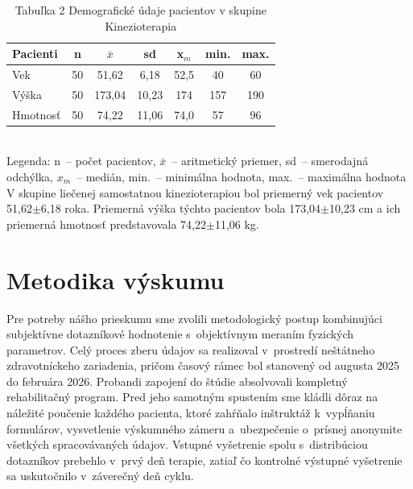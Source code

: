 \begin{table}[H]
\centering
\caption*{Tabuľka 2 Demografické údaje pacientov v skupine Kinezioterapia}
\begin{tabular}{|l|c|c|c|c|c|c|}
\hline
\textbf{Pacienti} & \textbf{n} & \textbf{$\bar{x}$} & \textbf{sd} & \textbf{x$_m$} & \textbf{min.} & \textbf{max.} \\ \hline
Vek & 50 & 51,62 & 6,18 & 52,5 & 40 & 60 \\ \hline
Výška & 50 & 173,04 & 10,23 & 174 & 157 & 190 \\ \hline
Hmotnosť & 50 & 74,22 & 11,06 & 74,0 & 57 & 96 \\ \hline
\end{tabular}
\\
\footnotesize{Legenda: n~-- počet pacientov, $\bar{x}$~-- aritmetický priemer, sd~-- smerodajná odchýlka, $x_m$~-- medián, min.~-- minimálna hodnota, max.~-- maximálna hodnota}
\vspace{0.5em}
\newline
V skupine liečenej samostatnou kinezioterapiou bol priemerný vek pacientov 51,62$\pm$6,18 roka. Priemerná výška týchto pacientov bola 173,04$\pm$10,23 cm a ich priemerná hmotnosť predstavovala 74,22$\pm$11,06 kg.
\label{tab:demografia_kin}
\end{table}





\clearpage
\clearpage
\section{Metodika výskumu}

Pre potreby nášho prieskumu sme zvolili metodologický postup kombinujúci subjektívne dotazníkové hodnotenie s~objektívnym meraním fyzických parametrov. Celý proces zberu údajov sa realizoval v~prostredí neštátneho zdravotníckeho zariadenia, pričom časový rámec bol stanovený od augusta 2025 do februára 2026. Probandi zapojení do štúdie absolvovali kompletný rehabilitačný program. Pred jeho samotným spustením sme kládli dôraz na náležité poučenie každého pacienta, ktoré zahŕňalo inštruktáž k~vypĺňaniu formulárov, vysvetlenie výskumného zámeru a~ubezpečenie o~prísnej anonymite všetkých spracovávaných údajov. Vstupné vyšetrenie spolu s~distribúciou dotazníkov prebehlo v~prvý deň terapie, zatiaľ čo kontrolné výstupné vyšetrenie sa uskutočnilo v~záverečný deň cyklu.

